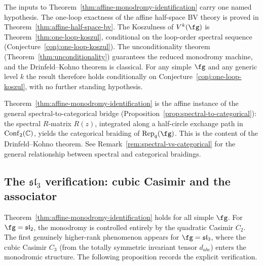 \begin{remark}
\label{rem:affine-unconditional}
The inputs to Theorem~\ref{thm:affine-monodromy-identification} carry one named hypothesis. The one-loop exactness of the affine half-space BV theory is proved in Theorem~\ref{thm:affine-half-space-bv}. The Koszulness of $V^k(\fg)$ is Theorem~\ref{thm:one-loop-koszul}, conditional on the loop-order spectral sequence (Conjecture~\ref{conj:one-loop-koszul}). The unconditionality theorem (Theorem~\ref{thm:unconditionality}) guarantees the reduced monodromy machine, and the Drinfeld--Kohno theorem is classical. For any simple $\fg$ and any generic level $k$ the result therefore holds conditionally on Conjecture~\ref{conj:one-loop-koszul}, with no further standing hypothesis.
\end{remark}

\begin{remark}
\label{rem:spectral-categorical-crossref}
Theorem~\ref{thm:affine-monodromy-identification} is the affine instance of the general spectral-to-categorical bridge (Proposition~\ref{prop:spectral-to-categorical}): the spectral $R$-matrix $R(z)$, integrated along a half-circle exchange path in $\mathrm{Conf}_2(\mathbb C)$, yields the categorical braiding of $\mathrm{Rep}_q(\fg)$. This is the content of the Drinfeld--Kohno theorem. See Remark~\ref{rem:spectral-vs-categorical} for the general relationship between spectral and categorical braidings.
\end{remark}

\subsection{The $\mathfrak{sl}_3$ verification: cubic Casimir and the associator}
\label{subsec:sl3-verification}

\providecommand{\fsl}{\mathfrak{sl}}

Theorem~\ref{thm:affine-monodromy-identification} holds for all simple $\fg$. For $\fg = \fsl_2$, the monodromy is controlled entirely by the quadratic Casimir $C_2$. The first genuinely higher-rank phenomenon appears for $\fg = \fsl_3$, where the cubic Casimir $C_3$ (from the totally symmetric invariant tensor $d_{abc}$) enters the monodromic structure. The following proposition records the explicit verification.

